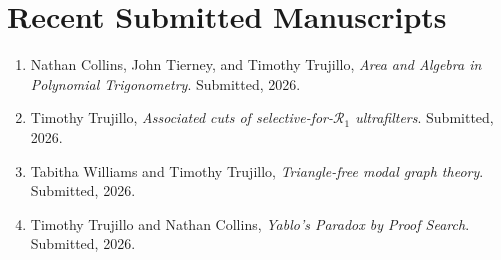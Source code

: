 \documentclass[10pt,letterpaper]{article}
\begin{document}
\section*{Recent Submitted Manuscripts}
\begin{enumerate}
\item Nathan Collins, John Tierney, and Timothy Trujillo, \emph{Area and Algebra in Polynomial Trigonometry}. Submitted, 2026.
\item Timothy Trujillo, \emph{Associated cuts of selective-for-$\mathcal R_1$ ultrafilters}. Submitted, 2026.
\item Tabitha Williams and Timothy Trujillo, \emph{Triangle-free modal graph theory}. Submitted, 2026.
\item Timothy Trujillo and Nathan Collins, \emph{Yablo's Paradox by Proof Search}. Submitted, 2026.
\end{enumerate}
\end{document}
